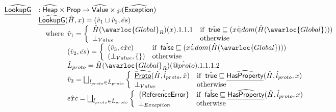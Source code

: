 \[\begin{array}{ll}
\ahf{LookupG} & : \aHeap \times \SF{Prop} \rightarrow \aValue \times \powerset{\abs{Exception}}\\
&
  \ahf{LookupG}(\hat{H},x)
   = (\hat{v}_1\sqcup\hat{v}_2, \hat{es})\\
& \quad\wherec{
  \hat{v}_1 = \left\{
    \begin{array}{ll}
      \hat{H}(\avarloc{Global}_R)(x).1.1.1
      & \ifc{\atrue\sqsubseteq(x \dot{\in} dom(\hat{H}(\avarloc{Global})))} \\
      \bot_{Value}
      & \owc \\
    \end{array}\right. \\
  (\hat{v}_2, \hat{es}) = \left\{
    \begin{array}{ll}
      (\hat{v}_3, \hat{exc})
      & \ifc{\afalse\sqsubseteq(x \dot{\in} dom(\hat{H}(\avarloc{Global})))}\\
      (\bot_{Value}, \{\})
      & \owc \\
    \end{array}\right. \\
  \hat{L}_{proto} = \hat{H}(\avarloc{Global}_R)(\hat{\varprop{proto}}).1.1.1.2\\
  \hat{v}_3 = 
    \bigsqcup_{\hat{l}_{proto}\in\hat{L}_{proto}}
    \left\{
    \begin{array}{ll}
      \ahf{Proto}(\hat{H}, \hat{l}_{proto}, \hat{x})
      & \ifc{\atrue\sqsubseteq\ahf{HasProperty}(\hat{H},\hat{l}_{proto},x)}\\
      \bot_{Value}
      & \owc \\
    \end{array}\right. \\
  \hat{exc} = 
    \bigsqcup_{\hat{l}_{proto}\in\hat{L}_{proto}}
    \left\{
    \begin{array}{ll}
      \{\hat{\SF{ReferenceError}}\}
      & \ifc{\afalse\sqsubseteq\ahf{HasProperty}(\hat{H},\hat{l}_{proto},x)}\\
      \bot_{Exception}
      & \owc \\
    \end{array}\right. \\
}
\\\\


\end{array}\]
